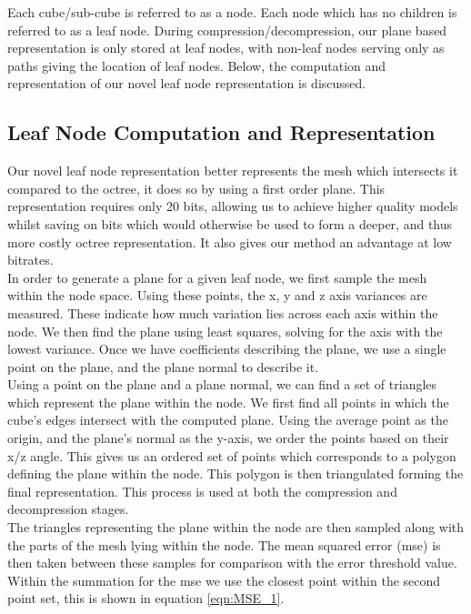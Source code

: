 Each cube/sub-cube is referred to as a node. Each node which has no children is referred to as a leaf node. During compression/decompression, our plane based representation is only stored at leaf nodes, with non-leaf nodes serving only as paths giving the location of leaf nodes. Below, the computation and representation of our novel leaf node representation is discussed. \\

\subsection{Leaf Node Computation and Representation}
\label{NRep}
Our novel leaf node representation better represents the mesh which intersects it compared to the octree, it does so by using a first order plane. This representation requires only 20 bits, allowing us to achieve higher quality models whilst saving on bits which would otherwise be used to form a deeper, and thus more costly octree representation. It also gives our method an advantage at low bitrates. \\

In order to generate a plane for a given leaf node, we first sample the mesh within the node space. Using these points, the x, y and z axis variances are measured. These indicate how much variation lies across each axis within the node. We then find the plane using least squares, solving for the axis with the lowest variance. Once we have coefficients describing the plane, we use a single point on the plane, and the plane normal to describe it. \\

Using a point on the plane and a plane normal, we can find a set of triangles which represent the plane within the node. We first find all points in which the cube's edges intersect with the computed plane. Using the average point as the origin, and the plane's normal as the y-axis, we order the points based on their x/z angle. This gives us an ordered set of points which corresponds to a polygon defining the plane within the node. This polygon is then triangulated forming the final representation. This process is used at both the compression and decompression stages. \\

The triangles representing the plane within the node are then sampled along with the parts of the mesh lying within the node. The mean squared error (mse) is then taken between these samples for comparison with the error threshold value. Within the summation for the mse we use the closest point within the second point set, this is shown in equation \ref{eqn:MSE_1}.

